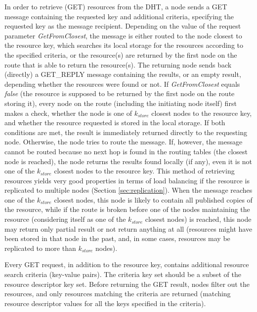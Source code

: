 In order to retrieve (GET) resources from the DHT, a node sends a GET message containing the requested key and additional criteria, specifying the requested key as the message recipient. Depending on the value of the request parameter \emph{GetFromClosest}, the message is either routed to the node closest to the resource key, which searches its local storage for the resources according to the specified criteria, or the resource(s) are returned by the first node on the route that is able to return the resource(s). The returning node sends back (directly) a GET\_REPLY message containing the results, or an empty result, depending whether the resources were found or not. If \emph{GetFromClosest} equals \emph{false} (the resource is supposed to be returned by the first node on the route storing it), every node on the route (including the initiating node itself) first makes a check, whether the node is one of $k_{store}$ closest nodes to the resource key, and whether the resource requested is stored in the local storage. If both conditions are met, the result is immediately returned directly to the requesting node. Otherwise, the node tries to route the message. If, however, the message cannot be routed because no next hop is found in the routing tables (the closest node is reached), the node returns the results found locally (if any), even it is not one of the $k_{store}$ closest nodes to the resource key. This method of retrieving resources yields very good properties in terms of load balancing if the resource is replicated to multiple nodes (Section \ref{sec:replication}). When the message reaches one of the $k_{store}$ closest nodes, this node is likely to contain all published copies of the resource, while if the route is broken before one of the nodes maintaining the resource (considering itself as one of the $k_{store}$ closest nodes) is reached, this node may return only partial result or not return anything at all (resources might have been stored in that node in the past, and, in some cases, resources may be replicated to more than $k_{store}$ nodes).

Every GET request, in addition to the resource key, contains additional resource search criteria (key-value pairs). The criteria key set should be a subset of the resource descriptor key set. Before returning the GET result, nodes filter out the resources, and only resources matching the criteria are returned (matching resource descriptor values for all the keys specified in the criteria).






